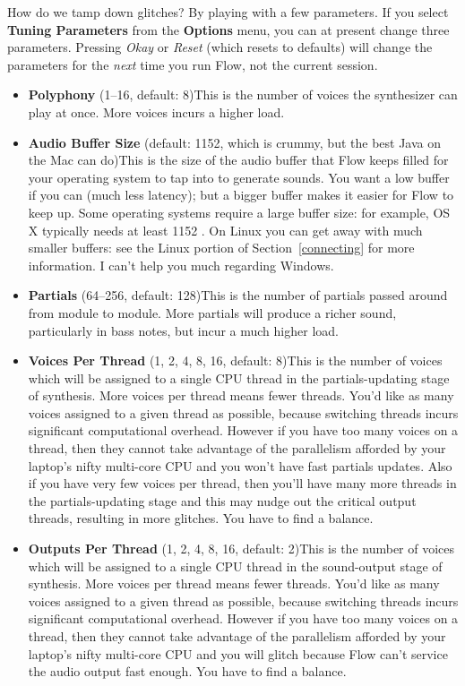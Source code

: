 \documentclass{article}
\newcommand\name{Flow}
\begin{document}
How do we tamp down glitches?  By playing with a few parameters. If you select {\bf Tuning Parameters} from the {\bf Options} menu, you can at present change three parameters.  Pressing {\it Okay} or {\it Reset} (which resets to defaults) will change the parameters for the {\it next} time you run {\name}, not the current session. 

\begin{itemize}
\item {\bf Polyphony} (1--16, default: 8)\qquad This is the number of voices the synthesizer can play at once.  More voices incurs a higher load.
\item {\bf Audio Buffer Size} (default: 1152, which is crummy, but the best Java on the Mac can do)\qquad This is the size of the audio buffer that {\name} keeps filled for your operating system to tap into to generate sounds.  You want a low buffer if you can (much less latency); but a bigger buffer makes it easier for Flow to keep up.  Some operating systems require a large buffer size: for example, OS X typically needs at least 1152 . On Linux you can get away with much smaller buffers: see the Linux portion of Section~\ref{connecting} for more information.  I can't help you much regarding Windows.

\item {\bf Partials} (64--256, default: 128)\qquad This is the number of partials passed around from module to module.  More partials will produce a richer sound, particularly in bass notes, but incur a much higher load.

\item {\bf Voices Per Thread} (1, 2, 4, 8, 16, default: 8)\qquad This is the number of voices which will be assigned to a single CPU thread in the partials-updating stage of synthesis.  More voices per thread means fewer threads.  You'd like as many voices assigned to a given thread as possible, because switching threads incurs significant computational overhead.  However if you have too many voices on a thread, then they cannot take advantage of the parallelism afforded by your laptop's nifty multi-core CPU and you won't have fast partials updates.  Also if you have very few voices per thread, then you'll have many more threads in the partials-updating stage and this may nudge out the critical output threads, resulting in more glitches.  You have to find a balance.  

\item {\bf Outputs Per Thread} (1, 2, 4, 8, 16, default: 2)\qquad This is the number of voices which will be assigned to a single CPU thread in the sound-output stage of synthesis.  More voices per thread means fewer threads.  You'd like as many voices assigned to a given thread as possible, because switching threads incurs significant computational overhead.  However if you have too many voices on a thread, then they cannot take advantage of the parallelism afforded by your laptop's nifty multi-core CPU and you will glitch because Flow can't service the audio output fast enough.  You have to find a balance.  
\end{itemize}
\end{document}
